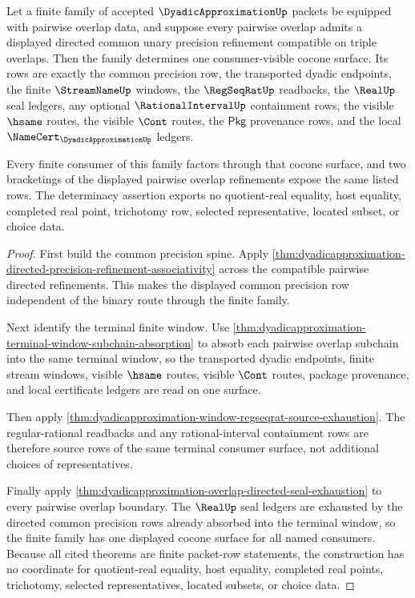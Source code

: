 \begin{theorem}\label{thm:dyadicapproximation-finite-overlap-cocone-determinacy}
Let a finite family of accepted $\DyadicApproximationUp$ packets be equipped
with pairwise overlap data, and suppose every pairwise overlap admits a
displayed directed common unary precision refinement compatible on triple
overlaps. Then the family determines one consumer-visible cocone surface. Its
rows are exactly the common precision row, the transported dyadic endpoints,
the finite $\StreamNameUp$ windows, the $\RegSeqRatUp$ readbacks, the
$\RealUp$ seal ledgers, any optional $\RationalIntervalUp$ containment rows,
the visible $\hsame$ routes, the visible $\Cont$ routes, the $\mathsf{Pkg}$
provenance rows, and the local $\NameCert_{\DyadicApproximationUp}$ ledgers.

Every finite consumer of this family factors through that cocone surface, and
two bracketings of the displayed pairwise overlap refinements expose the same
listed rows. The determinacy assertion exports no quotient-real equality, host
equality, completed real point, trichotomy row, selected representative,
located subset, or choice data.
\end{theorem}
\begin{proof}
First build the common precision spine. Apply
\autoref{thm:dyadicapproximation-directed-precision-refinement-associativity}
across the compatible pairwise directed refinements. This makes the displayed
common precision row independent of the binary route through the finite family.

Next identify the terminal finite window. Use
\autoref{thm:dyadicapproximation-terminal-window-subchain-absorption} to absorb
each pairwise overlap subchain into the same terminal window, so the transported
dyadic endpoints, finite stream windows, visible $\hsame$ routes, visible
$\Cont$ routes, package provenance, and local certificate ledgers are read on
one surface.

Then apply
\autoref{thm:dyadicapproximation-window-regseqrat-source-exhaustion}. The
regular-rational readbacks and any rational-interval containment rows are
therefore source rows of the same terminal consumer surface, not additional
choices of representatives.

Finally apply
\autoref{thm:dyadicapproximation-overlap-directed-seal-exhaustion} to every
pairwise overlap boundary. The $\RealUp$ seal ledgers are exhausted by the
directed common precision rows already absorbed into the terminal window, so
the finite family has one displayed cocone surface for all named consumers.
Because all cited theorems are finite packet-row statements, the construction
has no coordinate for quotient-real equality, host equality, completed real
points, trichotomy, selected representatives, located subsets, or choice data.
\end{proof}

